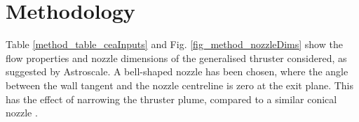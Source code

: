 \documentclass[journal]{new-aiaa}
\begin{document}
%



\section{Methodology}
\label{Section_Method}


%
%
%
%



 Table \ref{method_table_ceaInputs} and Fig. \ref{fig_method_nozzleDims} show the flow properties and nozzle dimensions of the generalised thruster considered, as suggested by Astroscale. A bell-shaped nozzle has been chosen, where the angle between the wall tangent and the nozzle centreline is zero at the exit plane. This has the effect of narrowing the thruster plume, compared to a similar conical nozzle \cite{chenNumericalSimulationEffects2025}.
 
\end{document}
